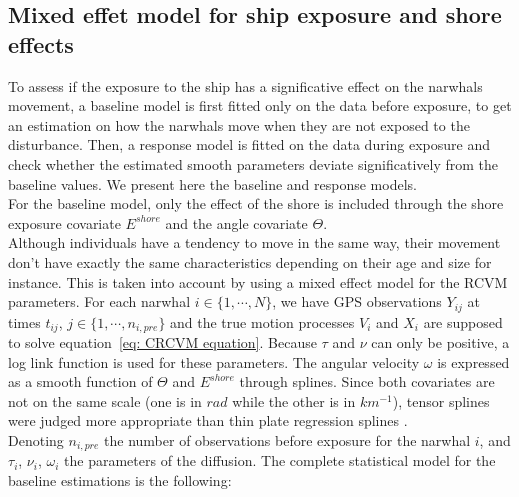 \documentclass[11pt]{article}
\newcommand {\1}{\mathbb{1}}
\theoremstyle{definition}
\theoremstyle{remark}
\theoremstyle{remark}
\begin{document}
\subsection{Mixed effet model for ship exposure and shore effects}
\label{subsection: ship exposure effect}


To assess if the exposure to the ship has a significative effect on the narwhals movement, a baseline model is first fitted only on the data before exposure, to get an estimation on how the narwhals move when they are not exposed to the disturbance. Then, a response model is fitted on the data during exposure and check whether the estimated smooth parameters deviate significatively from the baseline values. We present here the baseline and response models.\\

For the baseline model, only the effect of the shore is included through the shore exposure covariate $E^{shore}$ and the angle covariate $\Theta$.\\
Although individuals have a tendency to move in the same way, their movement don't have exactly the same characteristics depending on their age and size for instance. This is taken into account by using a mixed effect model for the RCVM parameters.
For each narwhal $i \in \{1, \cdots, N\}$, we have 	GPS observations $Y_{ij}$ at times $t_{ij}$, $j \in \{1,\cdots,n_{i,pre}\}$ and the true motion processes $V_i$ and $X_i$ are supposed to solve equation~\ref{eq: CRCVM equation}. Because $\tau$ and $\nu$ can only be positive, a log link function is used for these parameters. The angular velocity $\omega$ is expressed as a smooth function of $\Theta$ and $E^{shore}$ through splines. Since both covariates are not on the same scale (one is in $rad$ while the other is in $km^{-1}$), tensor splines were judged more appropriate than thin plate regression splines \cite{wood_generalized_2017}.\\

Denoting $n_{i,pre}$ the number of observations before exposure for the narwhal $i$, and $\tau_i$, $\nu_i$, $\omega_i$ the parameters of the diffusion. The complete statistical model for the baseline estimations is the following:
\end{document}
